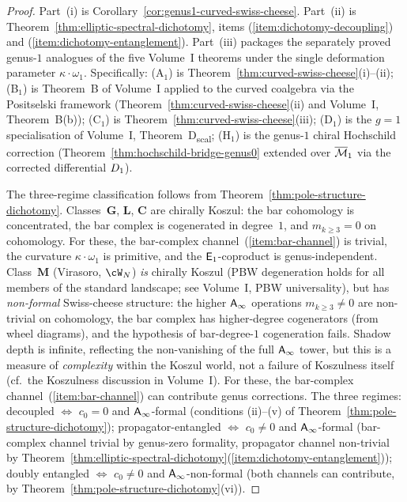 \begin{proof}
Part~(i) is
Corollary~\ref{cor:genus1-curved-swiss-cheese}.
Part~(ii) is
Theorem~\ref{thm:elliptic-spectral-dichotomy}, items
(\ref{item:dichotomy-decoupling}) and
(\ref{item:dichotomy-entanglement}).
Part~(iii) packages the separately proved genus-$1$ analogues of the
five Volume~I theorems under the single deformation parameter
$\kappa \cdot \omega_1$. Specifically:
(A$_1$) is
Theorem~\ref{thm:curved-swiss-cheese}(i)--(ii);
(B$_1$) is Theorem~B of Volume~I applied to the
curved coalgebra via the Positselski framework
(Theorem~\ref{thm:curved-swiss-cheese}(ii) and
Volume~I, Theorem~B(b));
(C$_1$) is Theorem~\ref{thm:curved-swiss-cheese}(iii);
(D$_1$) is the $g = 1$ specialisation of Volume~I,
Theorem~D\textsubscript{scal};
(H$_1$) is the genus-$1$ chiral Hochschild
correction
(Theorem~\ref{thm:hochschild-bridge-genus0}
extended over $\overline{\mathcal{M}}_1$ via the corrected differential
$D_{1}$).

The three-regime classification follows from
Theorem~\ref{thm:pole-structure-dichotomy}.
Classes~$\mathbf{G}$, $\mathbf{L}$, $\mathbf{C}$ are
chirally Koszul: the bar cohomology is concentrated,
the bar complex is cogenerated in degree~$1$, and
$m_{k \ge 3} = 0$ on cohomology. For these,
the bar-complex
channel~(\ref{item:bar-channel}) is trivial, the curvature
$\kappa \cdot \omega_1$ is primitive, and the $\mathsf{E}_1$-coproduct
is genus-independent.
Class~$\mathbf{M}$ (Virasoro, $\cW_N$) \emph{is} chirally
Koszul (PBW degeneration holds for all members of the
standard landscape; see Volume~I,
PBW universality), but has
\emph{non-formal} Swiss-cheese structure: the higher
$\mathsf{A}_{\infty}$ operations $m_{k \ge 3} \ne 0$ are non-trivial
on cohomology, the bar complex has higher-degree
cogenerators (from wheel diagrams), and the hypothesis of
bar-degree-$1$ cogeneration fails. Shadow depth is
infinite, reflecting the non-vanishing of the full
$\mathsf{A}_{\infty}$ tower, but this is a measure of \emph{complexity}
within the Koszul world, not a failure of Koszulness itself
\textup{(}cf.\ the Koszulness discussion in Volume~I\textup{)}.
For these, the bar-complex
channel~(\ref{item:bar-channel}) can contribute genus
corrections.
The three regimes:
decoupled $\Leftrightarrow$ $c_0 = 0$ and $\mathsf{A}_{\infty}$-formal
(conditions (ii)--(v) of
Theorem~\ref{thm:pole-structure-dichotomy});
propagator-entangled $\Leftrightarrow$ $c_0 \ne 0$ and
$\mathsf{A}_{\infty}$-formal (bar-complex channel trivial by genus-zero
formality,
propagator channel non-trivial by
Theorem~\ref{thm:elliptic-spectral-dichotomy}(\ref{item:dichotomy-entanglement}));
doubly entangled $\Leftrightarrow$ $c_0 \ne 0$ and
$\mathsf{A}_{\infty}$-non-formal (both channels can contribute, by
Theorem~\ref{thm:pole-structure-dichotomy}(vi)).
\end{proof}

